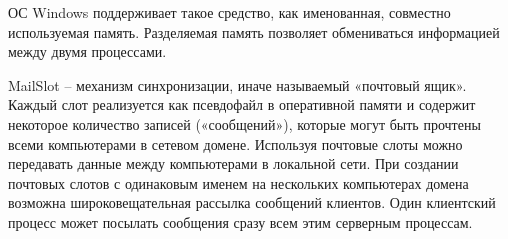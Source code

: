 \documentclass[a4paper]{article}
\begin{document}
	ОС Windows поддерживает такое средство, как именованная, совместно используемая память. Разделяемая память позволяет обмениваться информацией между двумя процессами.
	
	MailSlot – механизм синхронизации, иначе называемый «почтовый ящик». Каждый слот реализуется как псевдофайл в оперативной памяти и содержит некоторое количество записей («сообщений»), которые могут быть прочтены всеми компьютерами в сетевом домене. Используя почтовые слоты можно передавать данные между компьютерами в локальной сети. При создании почтовых слотов с одинаковым именем на нескольких компьютерах домена возможна широковещательная рассылка сообщений клиентов. Один клиентский процесс может посылать сообщения сразу всем этим серверным процессам.
	
\end{document}

